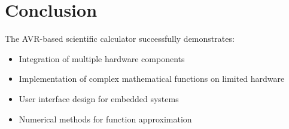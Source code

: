 \documentclass[journal]{IEEEtran}
\begin{document}
\section*{\textbf{Conclusion}}
The AVR-based scientific calculator successfully demonstrates:
\begin{itemize}
    \item Integration of multiple hardware components
    \item Implementation of complex mathematical functions on limited hardware
    \item User interface design for embedded systems
    \item Numerical methods for function approximation
\end{itemize}
\end{document}
